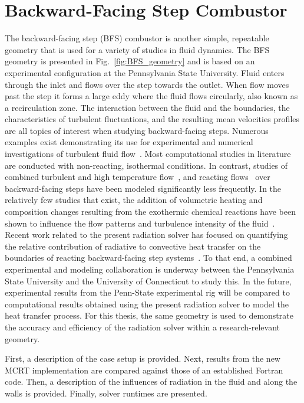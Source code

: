 \section{Backward-Facing Step Combustor}\label{section:BFS}
The backward-facing step (BFS) combustor is another simple, repeatable geometry that is used for a variety of studies in fluid dynamics. 
The BFS geometry is presented in Fig.~\ref{fig:BFS_geometry} and is based on an experimental configuration at the Pennsylvania State University.
Fluid enters through the inlet and flows over the step towards the outlet. When flow moves past the step it forms a large eddy where the fluid flows circularly, also known as a recirculation zone. The interaction between the fluid and the boundaries, the characteristics of turbulent fluctuations, and the resulting mean velocities profiles are all topics of interest when studying backward-facing steps. 
Numerous examples exist demonstrating its use for experimental and numerical investigations of turbulent fluid flow~\cite{Armaly1983ExperimentalFlow,Neto1993AStep,Jovic1994Backward-facing5000,Le1997DirectStep}. 
Most computational studies in literature are conducted with non-reacting, isothermal conditions.
In contrast, studies of combined turbulent and high temperature flow~\cite{Niemann2016Buoyancy-affectedNumber,Xie2017GeometrySteps}, and reacting flows~\cite{Pouech2021PremixedStep} over backward-facing steps have been modeled significantly less frequently.
In the relatively few studies that exist, the addition of volumetric heating and composition changes resulting from the exothermic chemical reactions have been shown to influence the flow patterns and turbulence intensity of the fluid~\cite{Pouech2021PremixedStep}. 
Recent work related to the present radiation solver has focused on quantifying the relative contribution of radiative to convective heat transfer on the boundaries of reacting backward-facing step systems~\cite{Colborn2023VariationCombustor}.
To that end, a combined experimental and modeling collaboration is underway between the Pennsylvania State University and the University of Connecticut to study this. In the future, experimental results from the Penn-State experimental rig will be compared to computational results obtained using the present radiation solver to model the heat transfer process. For this thesis, the same geometry is used to demonstrate the accuracy and efficiency of the radiation solver within a research-relevant geometry.

First, a description of the case setup is provided. Next, results from the new MCRT implementation are compared against those of an established Fortran code. Then, a description of the influences of radiation in the fluid and along the walls is provided. Finally, solver runtimes are presented.



